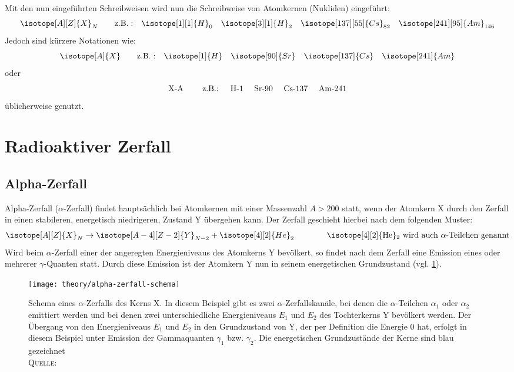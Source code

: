 \documentclass[../protokoll.tex]{subfiles}
\begin{document}
Mit den nun eingeführten Schreibweisen wird nun die Schreibweise von Atomkernen
(Nukliden) eingeführt:
\begin{equation*}
    \isotope[A][Z]{X}_N \qquad \mathrm{z.B.:} \quad 
    \isotope[1][1]{H}_0 \quad 
    \isotope[3][1]{H}_2 \quad
    \isotope[137][55]{Cs}_{82} \quad
    \isotope[241][95]{Am}_{146}
\end{equation*}
Jedoch sind kürzere Notationen wie:
\begin{equation*}
    \isotope[A]{X} \qquad \mathrm{z.B.:} \quad
    \isotope[1]{H} \quad 
    \isotope[90]{Sr} \quad
    \isotope[137]{Cs} \quad
    \isotope[241]{Am}
\end{equation*}
oder
\begin{equation*}
    \text{X-A \qquad z.B.: \quad
    H-1 \quad
    Sr-90 \quad
    Cs-137 \quad
    Am-241}
\end{equation*}
üblicherweise genutzt.
\newpage
\section{Radioaktiver Zerfall}
\subsection{Alpha-Zerfall}
Alpha-Zerfall ($\alpha$-Zerfall) findet hauptsächlich bei Atomkernen mit einer
Massenzahl $A > 200$ statt, wenn der Atomkern X durch den Zerfall in einen 
stabileren, energetisch niedrigeren, Zustand Y übergehen kann.
Der Zerfall geschieht hierbei nach dem folgenden Muster:
\begin{equation*}
    \isotope[A][Z]{X}_N \to \isotope[A-4][Z-2]{Y}_{N-2} + \isotope[4][2]{He}_{2}
     \qquad \qquad \text{\isotope[4][2]{He}$_{2}$ wird auch}\  \alpha \text{-Teilchen genannt}
\end{equation*}
Wird beim $\alpha$-Zerfall einer der angeregten Energieniveaus des Atomkerns Y
bevölkert, so findet nach dem Zerfall eine Emission eines oder mehrerer
$\gamma$-Quanten statt. Durch diese Emission ist der Atomkern Y nun in seinem
energetischen Grundzustand (vgl. \cref{fig:Schema Alpha-Zerfall}).

\begin{figure}[H]
    \centering
    \texttt{[image: theory/alpha-zerfall-schema]}
    \caption{Schema eines $\alpha$-Zerfalls des Kerns X. In diesem Beispiel gibt
    es zwei $\alpha$-Zerfallskanäle, bei denen die $\alpha$-Teilchen $\alpha_1$
    oder $\alpha_2$ emittiert werden und bei denen zwei unterschiedliche 
    Energieniveaus $E_1$ und $E_2$ des Tochterkerns Y bevölkert werden. Der 
    Übergang von den Energieniveaus $E_1$ und $E_2$ in den Grundzustand von Y, 
    der per Definition die Energie 0 hat, erfolgt in diesem Beispiel unter 
    Emission der Gammaquanten $\gamma_1$ bzw. $\gamma_2$. Die energetischen 
    Grundzustände der Kerne sind blau gezeichnet\\ \textsc{Quelle:} \cite[S. 30, Abb. 1]{script}}
    \label{fig:Schema Alpha-Zerfall}
\end{figure}
\end{document}
